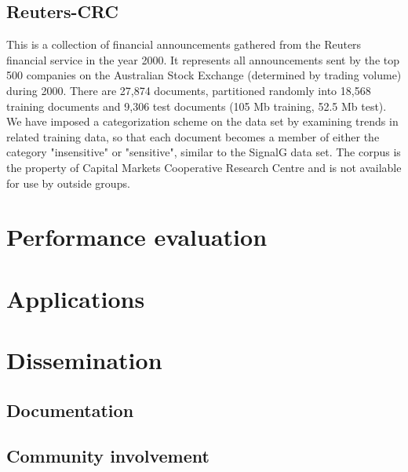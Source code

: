\subsection{Reuters-CRC}
This is a collection of financial announcements gathered from the
Reuters financial service in the year 2000.  It represents all
announcements sent by the top 500 companies on the Australian Stock
Exchange (determined by trading volume) during 2000.  There are 27,874
documents, partitioned randomly into 18,568 training documents and
9,306 test documents (105 Mb training, 52.5 Mb test).  We have imposed
a categorization scheme on the data set by examining trends in related
training data, so that each document becomes a member of either the
category "insensitive" or "sensitive", similar to the SignalG data
set.  The corpus is the property of Capital Markets Cooperative
Research Centre and is not available for use by outside groups.


\section{Performance evaluation}

\section{Applications}


\section{Dissemination}
\subsection{Documentation}
\subsection{Community involvement}
